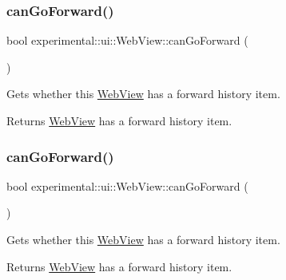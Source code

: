 \subsubsection{\texorpdfstring{can\+Go\+Forward()}{canGoForward()}\hspace{0.1cm}{\footnotesize\ttfamily [1/2]}}
{\footnotesize\ttfamily bool experimental\+::ui\+::\+Web\+View\+::can\+Go\+Forward (\begin{DoxyParamCaption}{ }\end{DoxyParamCaption})}

Gets whether this \hyperlink{classexperimental_1_1ui_1_1WebView}{Web\+View} has a forward history item.

\begin{DoxyReturn}{Returns}
\hyperlink{classexperimental_1_1ui_1_1WebView}{Web\+View} has a forward history item. 
\end{DoxyReturn}
\mbox{\label{classexperimental_1_1ui_1_1WebView_a14f0dfa319d36a74db5afddf1a998b7d}} 
\subsubsection{\texorpdfstring{can\+Go\+Forward()}{canGoForward()}\hspace{0.1cm}{\footnotesize\ttfamily [2/2]}}
{\footnotesize\ttfamily bool experimental\+::ui\+::\+Web\+View\+::can\+Go\+Forward (\begin{DoxyParamCaption}{ }\end{DoxyParamCaption})}

Gets whether this \hyperlink{classexperimental_1_1ui_1_1WebView}{Web\+View} has a forward history item.

\begin{DoxyReturn}{Returns}
\hyperlink{classexperimental_1_1ui_1_1WebView}{Web\+View} has a forward history item. 
\end{DoxyReturn}
\mbox{\label{classexperimental_1_1ui_1_1WebView_aac00e7ed03953cdfc444c04aa33c61a8}} 
